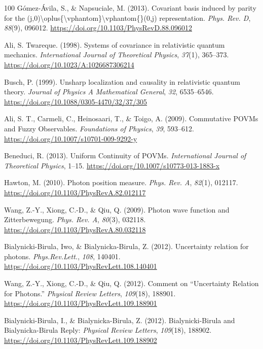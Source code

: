 \documentclass[11pt]{book}
\begin{document}
\begin{thebibliography}{100}
 Gómez-Ávila, S., \& Napsuciale, M. (2013). Covariant basis induced by
parity for the
(j,0)\textbackslash oplus\{\textbackslash vphantom\}\textbackslash vphantom\{\}(0,j)
representation. \emph{Phys. Rev. D}, \emph{88}(9), 096012.
\url{https://doi.org/10.1103/PhysRevD.88.096012}

 Ali, S. Twareque. (1998). Systems of covariance in relativistic quantum
mechanics. \emph{International Journal of Theoretical Physics},
\emph{37}(1), 365--373. \url{https://doi.org/10.1023/A:1026687306214}

 Busch, P. (1999). Unsharp localization and causality in relativistic
quantum theory. \emph{Journal of Physics A Mathematical General},
\emph{32}, 6535--6546. \url{https://doi.org/10.1088/0305-4470/32/37/305}

 Ali, S. T., Carmeli, C., Heinosaari, T., \& Toigo, A. (2009).
Commutative POVMs and Fuzzy Observables. \emph{Foundations of Physics},
\emph{39}, 593--612. \url{https://doi.org/10.1007/s10701-009-9292-y}

 Beneduci, R. (2013). Uniform Continuity of POVMs. \emph{International
Journal of Theoretical Physics}, 1--15.
\url{https://doi.org/10.1007/s10773-013-1883-x}

 Hawton, M. (2010). Photon position measure. \emph{Phys. Rev. A},
\emph{82}(1), 012117. \url{https://doi.org/10.1103/PhysRevA.82.012117}

 Wang, Z.-Y., Xiong, C.-D., \& Qiu, Q. (2009). Photon wave function and
Zitterbewegung. \emph{Phys. Rev. A}, \emph{80}(3), 032118.
\url{https://doi.org/10.1103/PhysRevA.80.032118}

 Bialynicki-Birula, Iwo, \& Bialynicka-Birula, Z. (2012). Uncertainty
relation for photons. \emph{Phys.Rev.Lett.}, \emph{108}, 140401.
\url{https://doi.org/10.1103/PhysRevLett.108.140401}

 Wang, Z.-Y., Xiong, C.-D., \& Qiu, Q. (2012). Comment on {``Uncertainty
Relation for Photons.''} \emph{Physical Review Letters}, \emph{109}(18),
188901. \url{https://doi.org/10.1103/PhysRevLett.109.188901}

 Bialynicki-Birula, I., \& Bialynicka-Birula, Z. (2012).
Bialynicki-Birula and Bialynicka-Birula Reply: \emph{Physical Review
Letters}, \emph{109}(18), 188902.
\url{https://doi.org/10.1103/PhysRevLett.109.188902}


\end{thebibliography}
\end{document}
